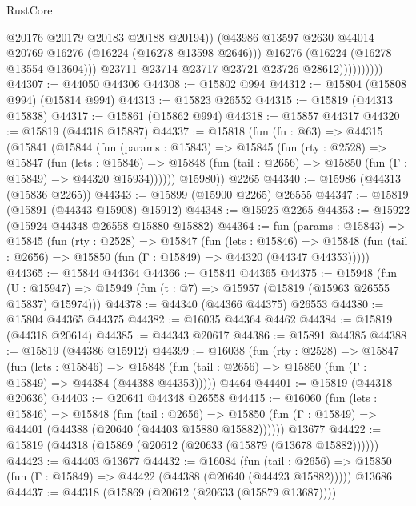 \begin{lexlean}{RustCore}
\begin{coremodule}
                              @20176
                              @20179
                              @20183
                              @20188
                              @20194))
                          (@43986 @13597 @2630 @44014 @20769 @16276 (@16224 (@16278 @13598 @2646)))
                          @16276
                          (@16224 (@16278 @13554 @13604)))
                        @23711
                        @23714
                        @23717
                        @23721
                        @23726
                        @28612))))))))))
@44307 := @44050 @44306
@44308 := @15802 @994
@44312 := @15804 (@15808 @994) (@15814 @994)
@44313 := @15823 @26552
@44315 := @15819 (@44313 @15838)
@44317 := @15861 (@15862 @994)
@44318 := @15857 @44317
@44320 := @15819 (@44318 @15887)
@44337 := @15818
    (fun (fn : @63) =>
    @44315
      (@15841
        (@15844
          (fun (params : @15843) =>
          @15845
            (fun (rty : @2528) =>
            @15847
              (fun (lets : @15846) =>
              @15848 (fun (tail : @2656) => @15850 (fun (Γ : @15849) => @44320 @15934))))))
        @15980))
    @2265
@44340 := @15986 (@44313 (@15836 @2265))
@44343 := @15899 (@15900 @2265) @26555
@44347 := @15819 (@15891 (@44343 @15908) @15912)
@44348 := @15925 @2265
@44353 := @15922 (@15924 @44348 @26558 @15880 @15882)
@44364 := fun (params : @15843) =>
  @15845
    (fun (rty : @2528) =>
    @15847
      (fun (lets : @15846) =>
      @15848 (fun (tail : @2656) => @15850 (fun (Γ : @15849) => @44320 (@44347 @44353)))))
@44365 := @15844 @44364
@44366 := @15841 @44365
@44375 := @15948
    (fun (U : @15947) => @15949 (fun (t : @7) => @15957 (@15819 (@15963 @26555 @15837) @15974)))
@44378 := @44340 (@44366 @44375) @26553
@44380 := @15804 @44365 @44375
@44382 := @16035 @44364 @4462
@44384 := @15819 (@44318 @20614)
@44385 := @44343 @20617
@44386 := @15891 @44385
@44388 := @15819 (@44386 @15912)
@44399 := @16038
    (fun (rty : @2528) =>
    @15847
      (fun (lets : @15846) =>
      @15848 (fun (tail : @2656) => @15850 (fun (Γ : @15849) => @44384 (@44388 @44353)))))
    @4464
@44401 := @15819 (@44318 @20636)
@44403 := @20641 @44348 @26558
@44415 := @16060
    (fun (lets : @15846) =>
    @15848
      (fun (tail : @2656) =>
      @15850 (fun (Γ : @15849) => @44401 (@44388 (@20640 (@44403 @15880 @15882))))))
    @13677
@44422 := @15819 (@44318 (@15869 (@20612 (@20633 (@15879 (@13678 @15882))))))
@44423 := @44403 @13677
@44432 := @16084
    (fun (tail : @2656) => @15850 (fun (Γ : @15849) => @44422 (@44388 (@20640 (@44423 @15882)))))
    @13686
@44437 := @44318 (@15869 (@20612 (@20633 (@15879 @13687))))

\end{coremodule}
\end{lexlean}
